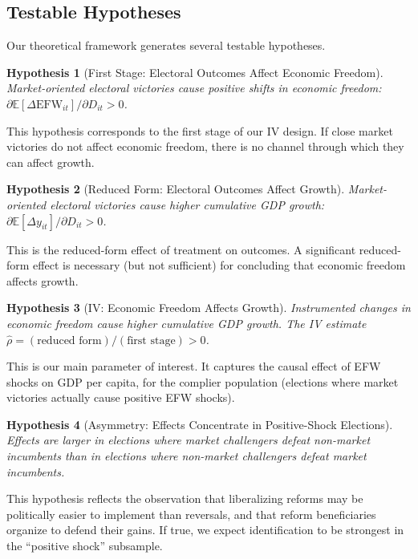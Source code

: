 \documentclass[12pt,a4paper]{article}
\newtheorem{hypothesis}{Hypothesis}
\newcommand{\E}{\mathbb{E}}
\newcommand{\efw}{\text{EFW}}
\begin{document}
\subsection{Testable Hypotheses}

Our theoretical framework generates several testable hypotheses.

\begin{hypothesis}[First Stage: Electoral Outcomes Affect Economic Freedom]
\label{hyp:first_stage}
Market-oriented electoral victories cause positive shifts in economic 
freedom: $\partial \E[\Delta \efw_{it}] / \partial D_{it} > 0$.
\end{hypothesis}

This hypothesis corresponds to the first stage of our IV design. If close 
market victories do not affect economic freedom, there is no channel through 
which they can affect growth.

\begin{hypothesis}[Reduced Form: Electoral Outcomes Affect Growth]
\label{hyp:reduced_form}
Market-oriented electoral victories cause higher cumulative GDP growth: 
$\partial \E[\Delta y_{it}] / \partial D_{it} > 0$.
\end{hypothesis}

This is the reduced-form effect of treatment on outcomes. A significant 
reduced-form effect is necessary (but not sufficient) for concluding that 
economic freedom affects growth.

\begin{hypothesis}[IV: Economic Freedom Affects Growth]
\label{hyp:iv}
Instrumented changes in economic freedom cause higher cumulative GDP growth. 
The IV estimate $\hat{\rho} = (\text{reduced form}) / (\text{first stage}) > 0$.
\end{hypothesis}

This is our main parameter of interest. It captures the causal effect of 
EFW shocks on GDP per capita, for the complier population (elections where 
market victories actually cause positive EFW shocks).

\begin{hypothesis}[Asymmetry: Effects Concentrate in Positive-Shock Elections]
\label{hyp:asymmetry}
Effects are larger in elections where market challengers defeat non-market 
incumbents than in elections where non-market challengers defeat market 
incumbents.
\end{hypothesis}

This hypothesis reflects the observation that liberalizing reforms may be 
politically easier to implement than reversals, and that reform beneficiaries 
organize to defend their gains. If true, we expect identification to be 
strongest in the ``positive shock'' subsample.
\end{document}
